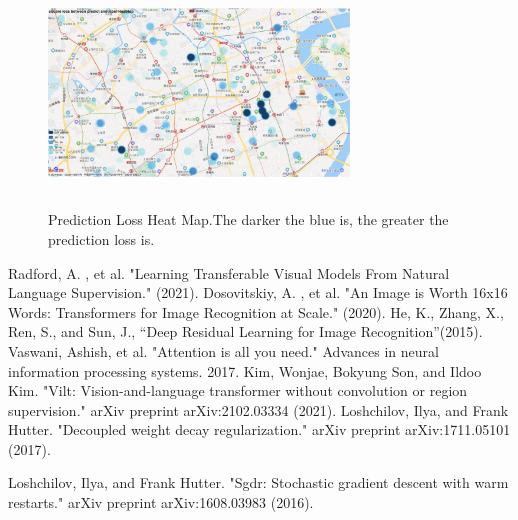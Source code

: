 \documentclass[final]{cvpr}
\begin{document}
\begin{figure}[h]
\centering
\includegraphics[width=8cm,height=6cm]{p7.jpg}
\caption{Prediction Loss Heat Map.The darker the blue is, the greater the prediction loss is.}
\end{figure}



{\small


}


\begin{thebibliography}{99}  
Radford, A. , et al. "Learning Transferable Visual Models From Natural Language Supervision." (2021).
Dosovitskiy, A. , et al. "An Image is Worth 16x16 Words: Transformers for Image Recognition at Scale." (2020).
He, K., Zhang, X., Ren, S., and Sun, J., “Deep Residual Learning for Image Recognition”(2015).
Vaswani, Ashish, et al. "Attention is all you need." Advances in neural information processing systems. 2017.
Kim, Wonjae, Bokyung Son, and Ildoo Kim. "Vilt: Vision-and-language transformer without convolution or region supervision." arXiv preprint arXiv:2102.03334 (2021).
Loshchilov, Ilya, and Frank Hutter. "Decoupled weight decay regularization." arXiv preprint arXiv:1711.05101 (2017).

Loshchilov, Ilya, and Frank Hutter. "Sgdr: Stochastic gradient descent with warm restarts." arXiv preprint arXiv:1608.03983 (2016).

\end{thebibliography}
\end{document}
